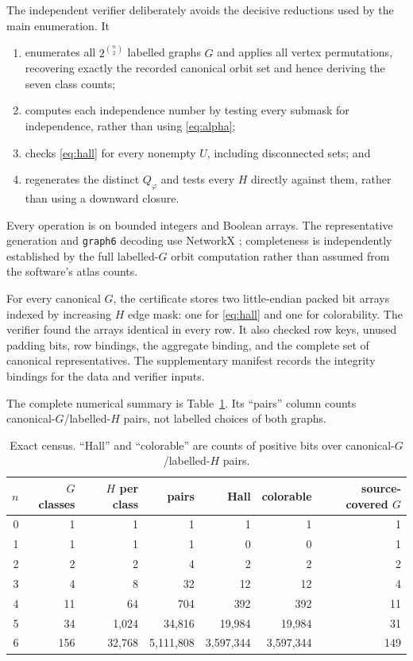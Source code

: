 \documentclass[11pt]{article}
\begin{document}
The independent verifier deliberately avoids the decisive reductions used by
the main enumeration.  It
\begin{enumerate}
  \item enumerates all $2^{\binom n2}$ labelled graphs $G$ and applies all
        vertex permutations, recovering exactly the recorded canonical orbit
        set and hence deriving the seven class counts;
  \item computes each independence number by testing every submask for
        independence, rather than using \eqref{eq:alpha};
  \item checks \eqref{eq:hall} for every nonempty $U$, including disconnected
        sets; and
  \item regenerates the distinct $Q_\varphi$ and tests every $H$ directly
        against them, rather than using a downward closure.
\end{enumerate}
Every operation is on bounded integers and Boolean arrays.  The representative
generation and \texttt{graph6} decoding use NetworkX
\cite{HagbergSchultSwart2008}; completeness is independently established by
the full labelled-$G$ orbit computation rather than assumed from the software's
atlas counts.

For every canonical $G$, the certificate stores two little-endian packed bit
arrays indexed by increasing $H$ edge mask: one for \eqref{eq:hall} and one for
colorability.  The verifier found the arrays identical in every row.  It also
checked row keys, unused padding bits, row bindings, the aggregate binding, and
the complete set of canonical representatives.  The supplementary manifest
records the integrity bindings for the data and verifier inputs.

The complete numerical summary is Table~\ref{tab:census}.  Its ``pairs'' column
counts canonical-$G$/labelled-$H$ pairs, not labelled choices of both graphs.

\begin{table}[ht]
\centering
\small
\begin{tabular}{rrrrrrr}
\toprule
$n$ & $G$ classes & $H$ per class & pairs & Hall & colorable & source-covered $G$\\
\midrule
0 & 1   & 1      & 1         & 1         & 1         & 1\\
1 & 1   & 1      & 1         & 0         & 0         & 1\\
2 & 2   & 2      & 4         & 2         & 2         & 2\\
3 & 4   & 8      & 32        & 12        & 12        & 4\\
4 & 11  & 64     & 704       & 392       & 392       & 11\\
5 & 34  & 1,024  & 34,816    & 19,984    & 19,984    & 31\\
6 & 156 & 32,768 & 5,111,808 & 3,597,344 & 3,597,344 & 149\\
\bottomrule
\end{tabular}
\caption{Exact census.  ``Hall'' and ``colorable'' are counts of positive bits
over canonical-$G$/labelled-$H$ pairs.}
\label{tab:census}
\end{table}
\end{document}

